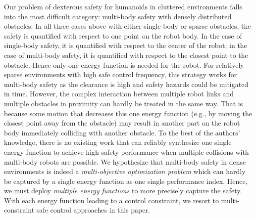 Our problem of dexterous safety for humanoids in cluttered environments falls into the most difficult category: multi-body safety with densely distributed obstacles.
In all three cases above with either single body or sparse obstacles, the safety is quantified with respect to one point on the robot body. In the case of single-body safety, it is quantified with respect to the center of the robot; in the case of multi-body safety, it is quantified with respect to the closest point to the obstacle. Hence only one energy function is needed for the robot. For relatively sparse environments with high safe control frequency, this strategy works for multi-body safety as the clearance is high and safety hazards could be mitigated in time. 
However, the complex interaction between multiple robot links and multiple obstacles in proximity can hardly be treated in the same way.
That is because some motion that decreases this one energy function (e.g., by moving the closest point away from the obstacle) may result in another part on the robot body immediately colliding with another obstacle. 
To the best of the authors' knowledge, there is no existing work that can reliably synthesize one single energy function to achieve high safety performance when multiple collisions with multi-body robots are possible. 
We hypothesize that multi-body safety in dense environments is indeed a \textit{multi-objective optimization problem} which can hardly be captured by a single energy function as one single performance index. 
Hence, we must deploy \textit{multiple energy functions} to more precisely capture the safety.
With each energy function leading to a control constraint, we resort to multi-constraint safe control approaches in this paper.


